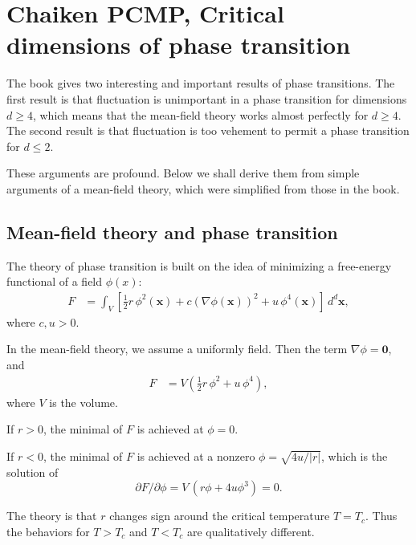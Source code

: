 \documentclass{article}
\begin{document}
\section{Chaiken PCMP, Critical dimensions of phase transition}

The book gives two interesting and important results of phase transitions.
%
The first result is that
fluctuation is unimportant in a phase transition for dimensions $d \ge 4$,
which means that the mean-field theory works almost perfectly for $d \ge 4$.
%
The second result is that
fluctuation is too vehement to permit a phase transition for $d \le 2$.

These arguments are profound.
Below we shall derive them from simple arguments of a mean-field theory,
which were simplified from those in the book.


\subsection{Mean-field theory and phase transition}



The theory of phase transition is built on the idea of minimizing
a free-energy functional of a field $\phi(x)$:
%
\begin{align}
F
&= \int_V \left[
\frac{1}{2}r \, \phi^2(\mathbf x) + c (\nabla \phi(\mathbf x))^2
+ u \, \phi^4(\mathbf x)
\right] \, d^d \mathbf x,
\label{eq:Fx}
\end{align}
where $c, u > 0$.

In the mean-field theory, we assume a uniformly field.
Then the term $\nabla \phi = \mathbf 0$, and
\begin{align}
F
&= V \left(
\frac{1}{2}r \, \phi^2 + u \, \phi^4
\right),
\end{align}
where $V$ is the volume.


If $r > 0$, the minimal of $F$ is achieved at $\phi = 0$.

If $r < 0$, the minimal of $F$ is achieved at a nonzero $\phi = \sqrt{4u/|r|}$,
which is the solution of
$$
\partial F/\partial \phi = V \, (r\phi + 4 u \phi^3) = 0.
$$



The theory is that $r$ changes sign around the critical temperature $T = T_c$.
%
Thus the behaviors for $T > T_c$ and $T < T_c$ are qualitatively different.
\end{document}

